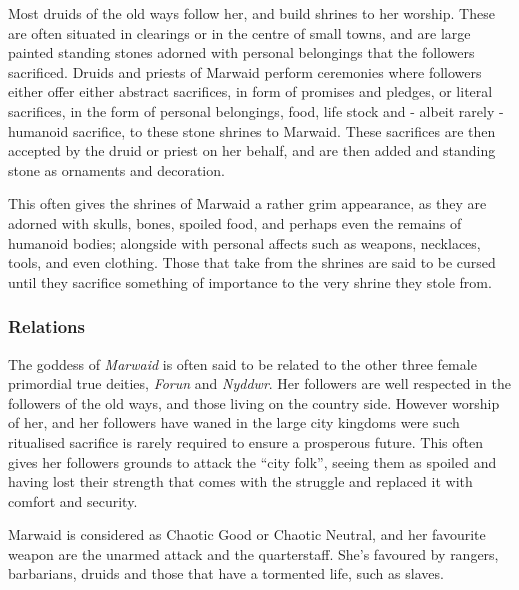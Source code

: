Most druids of the old ways follow her, and build shrines to her worship.
These are often situated in clearings or in the centre of small towns, and are
large painted standing stones adorned with personal belongings that the
followers sacrificed. Druids and priests of Marwaid perform ceremonies where
followers either offer either abstract sacrifices, in form of promises and
pledges, or literal sacrifices, in the form of personal belongings, food, life
stock and - albeit rarely - humanoid sacrifice, to these stone shrines to
Marwaid. These sacrifices are then accepted by the druid or priest on her
behalf, and are then added and standing stone as ornaments and decoration.

This often gives the shrines of Marwaid a rather grim appearance, as they are
adorned with skulls, bones, spoiled food, and perhaps even the remains of
humanoid bodies; alongside with personal affects such as weapons, necklaces,
tools, and even clothing. Those that take from the shrines are said to be
cursed until they sacrifice something of importance to the very shrine they
stole from.

\subsubsection*{Relations}

The goddess of \emph{Marwaid} is often said to be related to the other three
female primordial true deities, \emph{Forun} and \emph{Nyddwr}. Her followers
are well respected in the followers of the old ways, and those living on the
country side. However worship of her, and her followers have waned in the
large city kingdoms were such ritualised sacrifice is rarely required to
ensure a prosperous future. This often gives her followers grounds to attack
the ``city folk'', seeing them as spoiled and having lost their strength that
comes with the struggle and replaced it with comfort and security.

\begin{35e}
  Marwaid is considered as Chaotic Good or Chaotic Neutral, and her favourite
  weapon are the unarmed attack and the quarterstaff. She's favoured by rangers,
  barbarians, druids and those that have a tormented life, such as slaves.
\end{35e}

